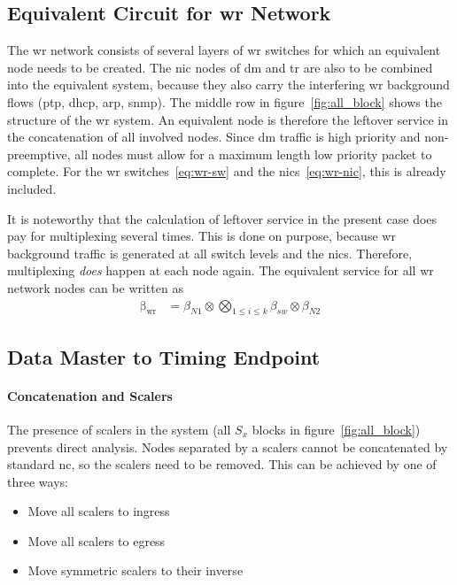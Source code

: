 \subsection{Equivalent Circuit for \gls{wr} Network}
The \gls{wr} network consists of several layers of \gls{wr} switches for which an equivalent node needs to be created. The \gls{nic} nodes of \gls{dm} and \gls{tr} are
also to be combined into the equivalent system, because they also carry the interfering \gls{wr} background flows (\gls{ptp}, \gls{dhcp}, \gls{arp}, \gls{snmp}).
The middle row in figure~\ref{fig:all_block} shows the structure of the \gls{wr} system. An equivalent node is therefore the leftover service 
in the concatenation of all involved nodes. Since \gls{dm} traffic is high priority and non-preemptive, all nodes must allow for a maximum length
low priority packet to complete. For the \gls{wr} switches~\ref{eq:wr-sw} and the \gls{nic}s~\ref{eq:wr-nic}, this is already included. 
\par
It is noteworthy that the calculation of leftover service in the present case does pay for multiplexing several times. 
This is done on purpose, because \gls{wr} background traffic is generated at all
switch levels and the \gls{nic}s. Therefore, multiplexing \emph{does} happen at each node again. The equivalent service for all \gls{wr} network nodes
can be written as
\begin{align}
\mathrm{\beta_{wr}} &= \beta_{N1} \otimes \bigotimes_{1 \le i \le k} \beta_{sw} \otimes \beta_{N2}
\label{eq:wr-serv}
\end{align}


\subsection{Data Master to Timing Endpoint}

\paragraph{Concatenation and Scalers}
The presence of scalers in the system (all $S_x$ blocks in figure~\ref{fig:all_block}) prevents direct analysis.
Nodes separated by a scalers cannot be concatenated by standard \gls{nc}, so the scalers need to be removed.
This can be achieved by one of three ways:
\begin{itemize}
\item{Move all scalers to ingress}
\item{Move all scalers to egress}
\item{Move symmetric scalers to their inverse}
\end{itemize}

